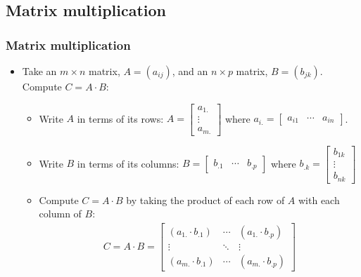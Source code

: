 \documentclass[handout]{beamer}
\numberwithin{equation}{section}
\begin{document}
\subsection{Matrix multiplication}

\begin{frame}
\frametitle{Matrix multiplication} \scriptsize
\begin{itemize}\scriptsize
\item Take an $m \times n$ matrix, $A = (a_{ij})$, and an $n \times p$ matrix, $B = (b_{jk})$. Compute $C = A \cdot B$:
\begin{itemize}\scriptsize
\pause \item Write $A$ in terms of its rows: $A = \begin{bmatrix} a_{1.} \\ \vdots \\ a_{m.} \end{bmatrix}$ where $a_{i.} = \begin{bmatrix} a_{i1} & \cdots & a_{in} \end{bmatrix}$.
\pause \item Write $B$ in terms of its columns: $B = \begin{bmatrix} b_{.1} & \cdots & b_{.p} \end{bmatrix}$ where $b_{.k} = \begin{bmatrix} b_{1k}  \\ \vdots \\ b_{nk} \end{bmatrix}$
\pause \item Compute $C = A \cdot B$ by taking the product of each row of $A$ with each column of $B$:
\pause \begin{align*}
C = A \cdot B = \begin{bmatrix}
(a_{1.} \cdot b_{.1}) &  \cdots & (a_{1.} \cdot b_{.p})  \\
\vdots & \ddots & \vdots \\
(a_{m.} \cdot b_{.1})  &  \cdots & (a_{m.} \cdot b_{.p}) 
\end{bmatrix}
\end{align*}
\end{itemize}
\end{itemize}
\end{frame}
\end{document}
